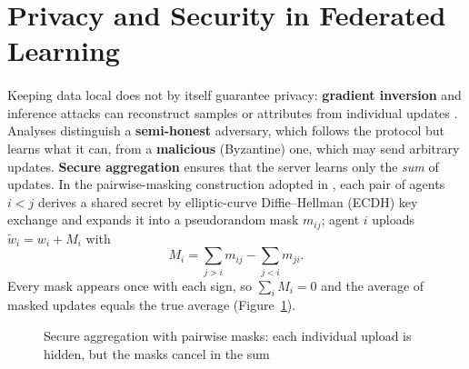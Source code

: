 \documentclass[12pt,a4paper,final]{extreport}
\begin{document}
\section{Privacy and Security in Federated Learning}

\paragraph{} Keeping data local does not by itself guarantee privacy: \textbf{gradient inversion} and inference attacks can reconstruct samples or attributes from individual updates \cite{p2}. Analyses distinguish a \textbf{semi-honest} adversary, which follows the protocol but learns what it can, from a \textbf{malicious} (Byzantine) one, which may send arbitrary updates. \textbf{Secure aggregation} ensures that the server learns only the \emph{sum} of updates. In the pairwise-masking construction adopted in \cite{p2}, each pair of agents $i<j$ derives a shared secret by elliptic-curve Diffie--Hellman (ECDH) key exchange and expands it into a pseudorandom mask $m_{ij}$; agent $i$ uploads $\tilde{w}_i=w_i+M_i$ with
\begin{equation}
M_i=\sum_{j>i}m_{ij}-\sum_{j<i}m_{ji}.
\end{equation}
Every mask appears once with each sign, so $\sum_iM_i=0$ and the average of masked updates equals the true average (Figure~\ref{fig:secagg}).

\begin{figure}[htbp]
\centering
{}
\caption{Secure aggregation with pairwise masks: each individual upload is hidden, but the masks cancel in the sum}
\label{fig:secagg}
\end{figure}
\end{document}
